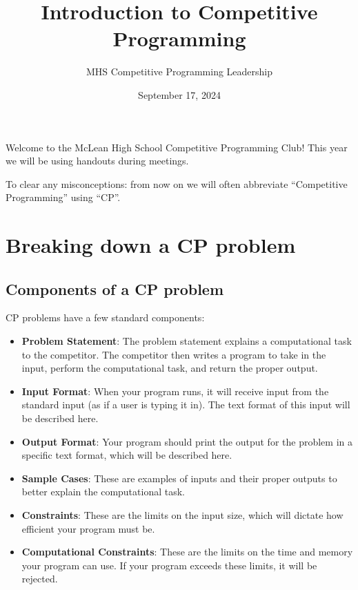 \documentclass{article}
\title{Introduction to Competitive Programming}
\date{September 17, 2024}
\author{MHS Competitive Programming Leadership}
\begin{document}
\maketitle
Welcome to the McLean High School Competitive Programming Club! This year we will be using handouts during meetings.

To clear any misconceptions: from now on we will often abbreviate ``Competitive Programming'' using ``CP''.

\section{Breaking down a CP problem}

\subsection{Components of a CP problem}
CP problems have a few standard components:
\begin{itemize}
    \item \textbf{Problem Statement}: The problem statement explains a computational task to the competitor. The competitor then writes a program to take in the input, perform the computational task, and return the proper output. 
    \item \textbf{Input Format}: When your program runs, it will receive input from the standard input (as if a user is typing it in). The text format of this input will be described here.
    \item \textbf{Output Format}: Your program should print the output for the problem in a specific text format, which will be described here.
    \item \textbf{Sample Cases}: These are examples of inputs and their proper outputs to better explain the computational task.
    \item \textbf{Constraints}: These are the limits on the input size, which will dictate how efficient your program must be.
    \item \textbf{Computational Constraints}: These are the limits on the time and memory your program can use. If your program exceeds these limits, it will be rejected.
\end{itemize}
\end{document}
